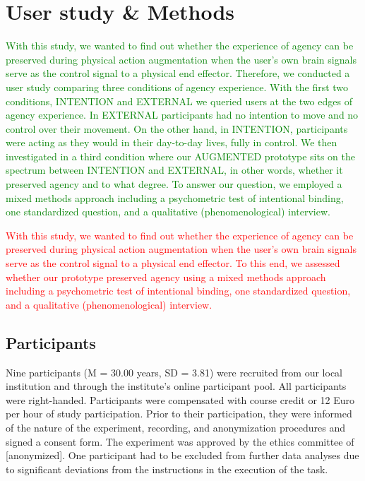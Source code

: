 
\section{User study \& Methods}
\textcolor{green}{With this study, we wanted to find out whether the experience of agency can be preserved during physical action augmentation when the user's own brain signals serve as the control signal to a physical end effector. Therefore, we conducted a user study comparing three conditions of agency experience. With the first two conditions, INTENTION and EXTERNAL we queried users at the two edges of agency experience. In EXTERNAL participants had no intention to move and no control over their movement. On the other hand, in INTENTION, participants were acting as they would in their day-to-day lives, fully in control. We then investigated in a third condition where our AUGMENTED prototype sits on the spectrum between INTENTION and EXTERNAL, in other words, whether it preserved agency and to what degree. To answer our question, we employed a mixed methods approach including a psychometric test of intentional binding, one standardized question, and a qualitative (phenomenological) interview.}

\textcolor{red}{With this study, we wanted to find out whether the experience of agency can be preserved during physical action augmentation when the user’s own brain signals serve as the control signal to a physical end effector. To this end, we assessed whether our prototype preserved agency using a mixed methods approach including a psychometric test of intentional binding, one standardized question, and a qualitative (phenomenological) interview.}

\subsection{Participants}
Nine participants (M = 30.00 years, SD = 3.81) were recruited from our local institution and through the institute's online participant pool. All participants were right-handed. Participants were compensated with course credit or 12 Euro per hour of study participation. Prior to their participation, they were informed of the nature of the experiment, recording, and anonymization procedures and signed a consent form. The experiment was approved by the ethics committee of [anonymized]. One participant had to be excluded from further data analyses due to significant deviations from the instructions in the execution of the task.

